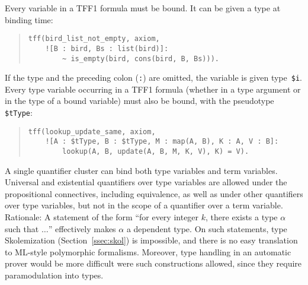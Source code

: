 Every variable in a TFF1 formula must be bound. It can be given a type at
binding time:
\begin{quote}
\begin{verbatim}
tff(bird_list_not_empty, axiom,
    ![B : bird, Bs : list(bird)]:
        ~ is_empty(bird, cons(bird, B, Bs))).
\end{verbatim}
\end{quote}
If the type and the preceding colon ({\tt :}) are omitted, the variable is given
type~{\tt\$i}. Every type variable occurring in a TFF1 formula
(whether in a type argument or in the type of a bound variable)
must also be bound, with the pseudotype {\tt\$tType}:
\begin{quote}
\begin{verbatim}
tff(lookup_update_same, axiom,
    ![A : $tType, B : $tType, M : map(A, B), K : A, V : B]:
        lookup(A, B, update(A, B, M, K, V), K) = V).
\end{verbatim}
\end{quote}
A single quantifier cluster can bind both type variables and term variables.
%
Universal and existential quantifiers over type variables are allowed under the
propositional connectives, including equivalence, as well as under other
quantifiers over type variables, but not in the scope of a quantifier over a
term variable.
Rationale: A statement of the form ``for every integer $k$, there exists a type
$\alpha$ such that $\ldots$'' effectively makes $\alpha$ a dependent type.
On such statements, type Skolemization (Section~\ref{ssec:skol}) is impossible,
and there is no easy translation to ML-style polymorphic formalisms.
Moreover, type handling in an automatic prover would be more difficult were
such constructions allowed, since they require paramodulation into types.


